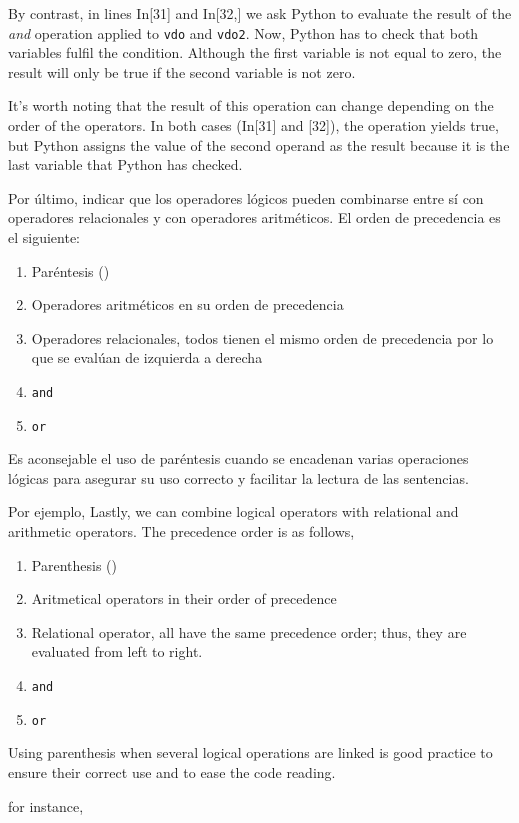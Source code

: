 \begin{paracol}{2}
By contrast, in lines In[31] and In[32,] we ask Python to evaluate the result of the \emph{and} operation applied to \texttt{vdo} and \texttt{vdo2}. Now, Python has to check that both variables fulfil the condition. Although the first variable is not equal to zero, the result will only be true if the second variable is not zero.

It's worth noting that the result of this operation can change depending on the order of the operators. In both cases (In[31] and [32]), the operation yields true, but Python assigns the value of the second operand as the result because it is the last variable that Python has checked.
\end{paracol}

\begin{paracol}{2}
Por último, indicar que los operadores lógicos pueden combinarse entre sí con operadores relacionales y con operadores aritméticos. El orden de precedencia es el siguiente:
\begin{enumerate}
\item  Paréntesis ()
\item  Operadores aritméticos en su orden de precedencia
\item  Operadores relacionales, todos tienen el mismo orden de precedencia por lo que se evalúan de izquierda a derecha
\item \texttt{and}
\item \texttt{or}
\end{enumerate}

Es aconsejable el uso de paréntesis cuando se encadenan varias operaciones lógicas para asegurar su uso correcto y facilitar la lectura de las sentencias.

Por ejemplo,
\switchcolumn
Lastly, we can combine logical operators with relational and arithmetic operators. The precedence order is as follows,
\begin{enumerate}
\item  Parenthesis ()
\item  Aritmetical operators in their order of precedence
\item  Relational operator, all have the same precedence order; thus, they are evaluated from left to right.
\item \texttt{and}
\item \texttt{or}
\end{enumerate}

Using parenthesis when several logical operations are linked is good practice to ensure their correct use and to ease the code reading.  

for instance,
\end{paracol} 

